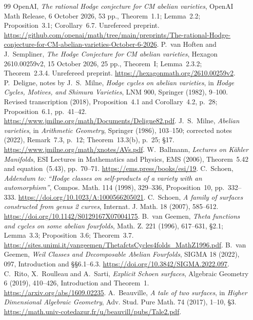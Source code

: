\documentclass[11pt]{article}
\theoremstyle{definition}
\theoremstyle{remark}
\begin{document}
\begin{thebibliography}{99}
 OpenAI, \emph{The rational Hodge conjecture for CM abelian varieties}, OpenAI Math Release, 6 October 2026, 53 pp., Theorem~1.1; Lemma~2.2; Proposition~3.1; Corollary~6.7. Unrefereed preprint. \url{https://github.com/openai/math/tree/main/preprints/The-rational-Hodge-conjecture-for-CM-abelian-varieties-October-6-2026}.
 P.~van Hoften and J.~Sempliner, \emph{The Hodge Conjecture for CM abelian varieties}, Hexagon 2610.00259v2, 15 October 2026, 25 pp., Theorem~I; Lemma~2.3.2; Theorem~2.3.4. Unrefereed preprint. \url{https://hexagonmath.org/2610.00259v2}.
 P.~Deligne, notes by J.~S.~Milne, \emph{Hodge cycles on abelian varieties}, in \emph{Hodge Cycles, Motives, and Shimura Varieties}, LNM 900, Springer (1982), 9--100. Revised transcription (2018), Proposition~4.1 and Corollary~4.2, p.~28; Proposition~6.1, pp.~41--42. \url{https://www.jmilne.org/math/Documents/Deligne82.pdf}.
 J.~S.~Milne, \emph{Abelian varieties}, in \emph{Arithmetic Geometry}, Springer (1986), 103--150; corrected notes (2022), Remark~7.3, p.~12; Theorem~13.3(b), p.~25; \S17. \url{https://www.jmilne.org/math/xnotes/AVs.pdf}.
 W.~Ballmann, \emph{Lectures on K\"ahler Manifolds}, ESI Lectures in Mathematics and Physics, EMS (2006), Theorem~5.42 and equation~(5.43), pp.~70--71. \url{https://ems.press/books/esi/19}.
 C.~Schoen, \emph{Addendum to: ``Hodge classes on self-products of a variety with an automorphism''}, Compos. Math. 114 (1998), 329--336, Proposition~10, pp.~332--333. \url{https://doi.org/10.1023/A:1000566205021}.
 C.~Schoen, \emph{A family of surfaces constructed from genus 2 curves}, Internat. J. Math. 18 (2007), 585--612. \url{https://doi.org/10.1142/S0129167X07004175}.
 B.~van Geemen, \emph{Theta functions and cycles on some abelian fourfolds}, Math. Z. 221 (1996), 617--631, \S2.1; Lemma~3.3; Proposition~3.6; Theorem~3.7. \url{https://sites.unimi.it/vangeemen/ThetafctsCycles4folds_MathZ1996.pdf}.
 B.~van Geemen, \emph{Weil Classes and Decomposable Abelian Fourfolds}, SIGMA 18 (2022), 097, Introduction and \S\S6.1--6.3. \url{https://doi.org/10.3842/SIGMA.2022.097}.
 C.~Rito, X.~Roulleau and A.~Sarti, \emph{Explicit Schoen surfaces}, Algebraic Geometry 6 (2019), 410--426, Introduction and Theorem~1. \url{https://arxiv.org/abs/1609.02235}.
 A.~Beauville, \emph{A tale of two surfaces}, in \emph{Higher Dimensional Algebraic Geometry}, Adv. Stud. Pure Math. 74 (2017), 1--10, \S3. \url{https://math.univ-cotedazur.fr/u/beauvill/pubs/Tale2.pdf}.

\end{thebibliography}
\end{document}

